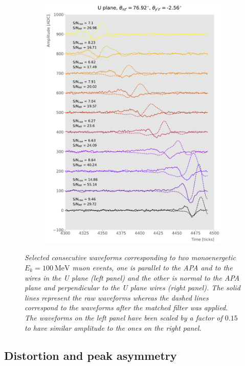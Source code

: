 \begin{figure}[t]
\begin{subfigure}{0.5\textwidth}
		\includegraphics[width=.99\linewidth]{Images/Matched_Filter/evt_xz_90_yz_0_U}
	\end{subfigure}
	\caption{\textit{Selected consecutive waveforms corresponding to two monoenergetic $E_{k} = 100 \ \mathrm{MeV}$ muon events, one is parallel to the APA and to the wires in the U plane (left panel) and the other is normal to the APA plane and perpendicular to the U plane wires (right panel). The solid lines represent the raw waveforms whereas the dashed lines correspond to the waveforms after the matched filter was applied. The waveforms on the left panel have been scaled by a factor of $0.15$ to have similar amplitude to the ones on the right panel.}}
	\label{fig:example_orientation}
\end{figure}

\subsection{Distortion and peak asymmetry}
\label{sec:A.5}

